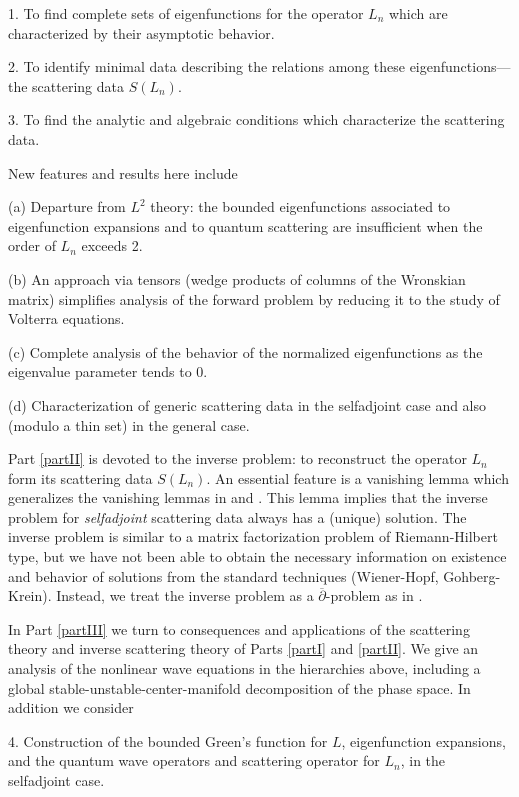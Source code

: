 \documentclass{surv-l}
\theoremstyle{plain}
\theoremstyle{definition}
\numberwithin{equation}{chapter}
\begin{document}
1. To find complete sets of eigenfunctions for the operator $L_{n}$ which are characterized by their asymptotic behavior.

2. To identify minimal data describing the relations among these eigenfunctions---the scattering data $S(L_{n})$.

3. To find the analytic and algebraic conditions which characterize the scattering data.

New features and results here include

(a) Departure from $L^{2}$ theory: the bounded eigenfunctions associated to eigenfunction expansions and to quantum scattering are insufficient when the order of $L_{n}$ exceeds 2.

(b) An approach via tensors (wedge products of columns of the Wronskian matrix) simplifies analysis of the forward problem by reducing it to the study of Volterra equations.

(c) Complete analysis of the behavior of the normalized eigenfunctions as the eigenvalue parameter tends to $0$.

(d) Characterization of generic scattering data in the selfadjoint case and also (modulo a thin set) in the general case.

Part \ref{partII} is devoted to the inverse problem: to reconstruct the operator $L_{n}$ form its scattering data $S(L_{n})$. An essential feature is a vanishing lemma which generalizes the vanishing lemmas in \cite{DT} and \cite{DTT}. This lemma implies that the inverse problem for \emph{selfadjoint} scattering data always has a (unique) solution. The inverse problem is similar to a matrix factorization problem of Riemann-Hilbert type, but we have not been able to obtain the necessary information on existence and behavior of solutions from the standard techniques (Wiener-Hopf, Gohberg-Krein). Instead, we treat the inverse problem as a $\overline{\partial}$-problem as in \cite{Be, BC1}.

In Part \ref{partIII} we turn to consequences and applications of the scattering theory and inverse scattering theory of Parts \ref{partI} and \ref{partII}. We give an analysis of the nonlinear wave equations in the hierarchies above, including a global stable-unstable-center-manifold decomposition of the phase space. In addition we consider

4. Construction of the bounded Green's function for $L$, eigenfunction expansions, and the quantum wave operators and scattering operator for $L_{n}$, in the selfadjoint case.
\end{document}
